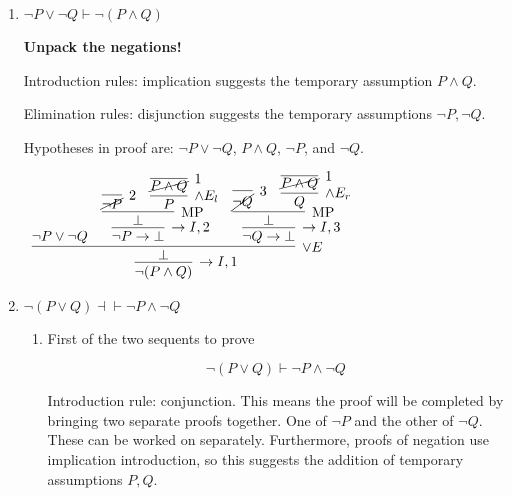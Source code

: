 \documentclass[11pt]{report}
\begin{document}
\begin{enumerate}
\begin{enumerate}
		\newpage
		\item $\lnot P \lor \lnot Q \vdash \lnot(P \land Q)$
				
		\hspace{0.2cm}{\bf Solution}

		{\bf Unpack the negations!}

		Introduction rules: implication suggests the temporary assumption $P \land Q$.

		\vspace{0.2cm}

		Elimination rules: disjunction suggests the temporary assumptions $\lnot P, \lnot Q$. 

		\vspace{0.2cm}

		Hypotheses in proof are: $\lnot P \lor \lnot Q$, $P \land Q$, $\lnot P$, and $\lnot Q$. 

		\begin{mdframed}
			\begin{center}
				$\begin{array}{c}
					\infer[\to I,1]{\lnot(P \land Q)}
						{\infer[\lor E]{\bot}
							{\lnot P \lor \lnot Q &
							\infer[\to I,2]{\lnot P \to \bot}
								{\infer[\MP]{\bot}
									{\infer[2]{\cancel{\lnot P}}{}
									&
									\infer[\land E_{l}]{P}{\infer[1]{\cancel{P \land Q}}{}}}}
								&
							\infer[\to I,3]{\lnot Q \to \bot}
								{\infer[\MP]{\bot}
									{\infer[3]{\cancel{\lnot Q}}{} 
									&
									\infer[\land E_{r}]{Q}{\infer[1]{\cancel{P \land Q}}{}}}}}}
				\end{array}$
			\end{center}
		\end{mdframed}
		
		\newpage
		\item $\lnot(P \lor Q) \dashv\vdash \lnot P \land \lnot Q$
				
		\hspace{0.2cm}{\bf Solution}
		
		\begin{enumerate}
		
			\item First of the two sequents to prove 
			
			$$\lnot(P \lor Q) \vdash \lnot P \land \lnot Q$$			
			
			Introduction rule: conjunction. This means the proof will be completed by bringing two separate proofs together. One of $\lnot P$ and the other of $\lnot Q$. These can be worked on separately. Furthermore, proofs of negation use implication introduction, so this suggests the addition of temporary assumptions $P,Q$.
			

\end{enumerate}
\end{enumerate}
\end{enumerate}
\end{document}
